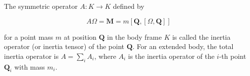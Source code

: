 The symmetric operator $A: K \to K$ defined by

$$A\Omega = \mathbf{M} = m[\mathbf{Q}, [\Omega, \mathbf{Q}]]$$

for a point mass $m$ at position $\mathbf{Q}$ in the body frame $K$ is called the inertia operator (or inertia tensor) of the point $\mathbf{Q}$. For an extended body, the total inertia operator is $A = \sum_i A_i$, where $A_i$ is the inertia operator of the $i$-th point $\mathbf{Q}_i$ with mass $m_i$.
